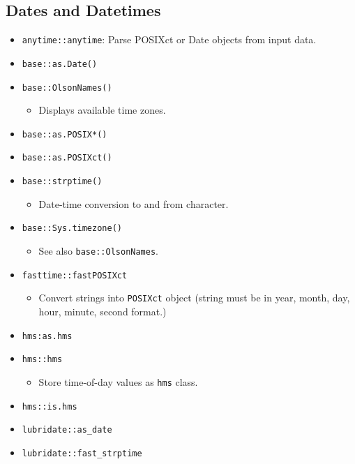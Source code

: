 \documentclass[
]{book}
\providecommand{\tightlist}{%
  \setlength{\itemsep}{0pt}\setlength{\parskip}{0pt}}
\begin{document}
\hypertarget{dates-and-datetimes}{%
\subsection{Dates and Datetimes}\label{dates-and-datetimes}}

\begin{itemize}
\tightlist
\item
  \texttt{anytime::anytime}: Parse POSIXct or Date objects from input data.
\item
  \texttt{base::as.Date()}
\item
  \texttt{base::OlsonNames()}

  \begin{itemize}
  \tightlist
  \item
    Displays available time zones.
  \end{itemize}
\item
  \texttt{base::as.POSIX*()}
\item
  \texttt{base::as.POSIXct()}
\item
  \texttt{base::strptime()}

  \begin{itemize}
  \tightlist
  \item
    Date-time conversion to and from character.
  \end{itemize}
\item
  \texttt{base::Sys.timezone()}

  \begin{itemize}
  \tightlist
  \item
    See also \texttt{base::OlsonNames}.
  \end{itemize}
\item
  \texttt{fasttime::fastPOSIXct}

  \begin{itemize}
  \tightlist
  \item
    Convert strings into \texttt{POSIXct} object (string must be in year, month, day, hour, minute, second format.)
  \end{itemize}
\item
  \texttt{hms:as.hms}
\item
  \texttt{hms::hms}

  \begin{itemize}
  \tightlist
  \item
    Store time-of-day values as \texttt{hms} class.
  \end{itemize}
\item
  \texttt{hms::is.hms}
\item
  \texttt{lubridate::as\_date}
\item
  \texttt{lubridate::fast\_strptime}


\end{itemize}
\end{document}
